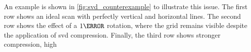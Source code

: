     \noindent An example is shown in \cref{fig:svd_counterexample} to illustrate this issue. The first row shows an ideal scan with perfectly vertical and horizontal lines. The second row shows the effect of a $1\degree$ rotation, where the grid remains visible despite the application of \gls{svd} compression. Finally, the third row shows stronger compression, high
